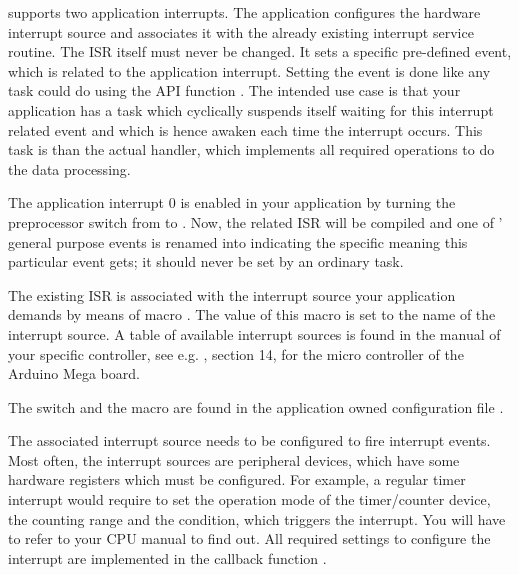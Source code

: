 \rtos{} supports two application interrupts. The application configures
the hardware interrupt source and associates it with the already existing
interrupt service routine. The ISR itself must never be changed. It sets a
specific pre-defined event, which is related to the application
interrupt. Setting the event is done like any task could do using the API
function . The intended use case is that your
application has a task which cyclically suspends itself waiting for this
interrupt related event and which is hence awaken each time the interrupt
occurs. This task is than the actual handler, which implements all
required operations to do the data processing.

The application interrupt 0 is enabled in your application by turning the
preprocessor switch  from
 to . Now, the related
ISR will be compiled and one of \rtos{}' general purpose events is renamed
into  indicating the specific
meaning this particular event gets; it should never be set by an ordinary
task.

The existing ISR is associated with the interrupt source your application
demands by means of macro . The value of this
macro is set to the name of the interrupt source. A table of available
interrupt sources is found in the manual of your specific controller, see
e.g. , section 14, for the micro controller of the Arduino Mega
board.

The switch  and the macro
 are found in the application owned
configuration file .

The associated interrupt source needs to be configured to fire interrupt
events. Most often, the interrupt sources are peripheral devices, which
have some hardware registers which must be configured. For example, a
regular timer interrupt would require to set the operation mode of the
timer/counter device, the counting range and the condition, which triggers
the interrupt. You will have to refer to your CPU manual to find out. All
required settings to configure the interrupt are implemented in the
callback function .

